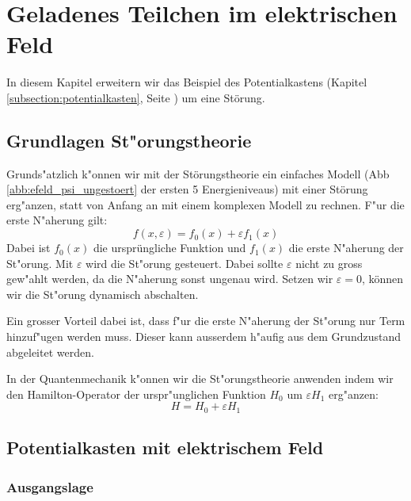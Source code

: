 \chapter{Geladenes Teilchen im elektrischen Feld\label{chapter:efeld}}
\begin{refsection}


In diesem Kapitel erweitern wir das Beispiel des Potentialkastens 
(Kapitel \ref{subsection:potentialkasten}, Seite \pageref{subsection:potentialkasten})
um eine St\"orung.

\section{Grundlagen St"orungstheorie}
Grunds"atzlich k"onnen wir mit der St\"orungstheorie ein einfaches Modell 
(Abb \ref{abb:efeld_psi_ungestoert} der ersten 5 Energieniveaus) 
mit einer St\"orung erg"anzen, statt von Anfang an mit einem komplexen Modell zu rechnen.
F"ur die erste N"aherung gilt:
\[
  f(x, \varepsilon) = f_0(x) + \varepsilon f_1(x)
\]
Dabei ist $f_0(x)$ die urspr\"ungliche Funktion und $f_1(x)$ die erste  N"aherung der St"orung.
Mit $\varepsilon$ wird die St"orung gesteuert. Dabei sollte $\varepsilon$ nicht zu gross gew"ahlt werden, 
da die N"aherung sonst ungenau wird. 
Setzen wir $\varepsilon = 0$, k\"onnen wir die St"orung dynamisch abschalten.

Ein grosser Vorteil dabei ist, dass f"ur die erste N"aherung der St"orung nur Term hinzuf"ugen werden muss.
Dieser kann ausserdem h"aufig aus dem Grundzustand abgeleitet werden.

In der Quantenmechanik k"onnen wir die St"orungstheorie anwenden indem wir den Hamilton-Operator der 
urspr"unglichen Funktion $H_0$ um $\varepsilon H_1$ erg"anzen:
\[
  H = H_0 + \varepsilon H_1
\]




\section{Potentialkasten mit elektrischem Feld}

\subsection{Ausgangslage}


\end{refsection}
